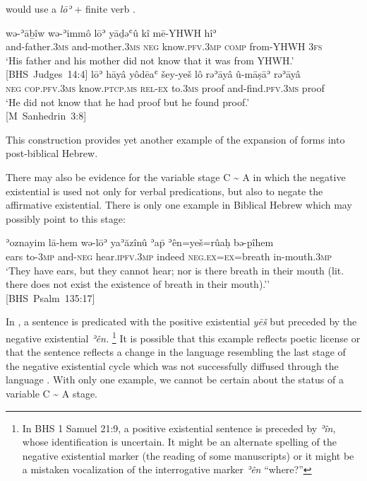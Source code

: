 ﻿\documentclass[output=paper]{langsci/langscibook}
\begin{document}
would use a \textit{lōʾ} + finite verb .
%
\begin{exe}\ex\begin{xlist}
\ex\label{ex:heb-father-and-mother}
\gll wə-ʾāḇîw wə-ʾimmô lōʾ yāḏəʿû kî mē-YHWH hîʾ \\ 
and-father.\textsc{3ms}  and-mother.\textsc{3ms} \textsc{neg}
know.\textsc{pfv.3mp}  \textsc{comp}   from-YHWH \textsc{3fs} \\
\glt `His father and his mother did not know that it was from YHWH.'\\
\mbox{[BHS Judges 14:4]}
%
\ex\label{ex:heb-found-proof}
 \gll lōʾ hāyâ yôdēaʿ šey-yeš lô rəʾāyâ û-māṣāʾ rəʾāyâ \\
\textsc{neg} \textsc{cop.pfv.3ms} know.\textsc{ptcp.ms} \textsc{rel-ex}
to.\textsc{3ms}   proof and-find.\textsc{pfv.3ms}   proof   \\
\glt `He did not know that he had proof but he found proof.'\\
\mbox{[M Sanhedrin 3:8]}
\end{xlist}\end{exe}
%
This construction provides yet another example of the expansion of forms into post-biblical Hebrew.

There may also be evidence for the variable stage C {\textasciitilde} A in which the negative existential is used not only for verbal predications, but also to negate the affirmative existential. There is only one example in Biblical Hebrew which may possibly point to this stage:
%
\begin{exe}\ex \label{ex:heb-ears}
    \gll ʾoznayim lā-hem wə-lōʾ yaʾăzînû ʾa\={p} ʾên=yeš=rûaḥ bə-p̱îhem \\
ears    to-\textsc{3mp}  and-\textsc{neg}  hear.\textsc{ipfv.3mp}   indeed 
  \textsc{neg.ex=ex}=breath  in-mouth.\textsc{3mp} \\
    \glt
`They have ears, but they cannot hear; nor is there breath in their mouth
(lit. there does not exist the existence of breath in their mouth).''\\
\mbox{[BHS Psalm 135:17]}
    \end{exe}
%
In , a sentence is predicated with the positive
existential \textit{yēš} but preceded by the negative existential
\textit{ʾên.}%
%
    \footnote{In BHS 1 Samuel 21:9, a positive existential
    sentence is preceded by \textit{ʾîn}, whose identification is uncertain. It
    might be an alternate spelling of the negative existential marker (the
    reading of some manuscripts) or it might be a mistaken vocalization of the
    interrogative marker \textit{ʾên} ``where?''} %
%
It is possible that this
example reflects poetic license or that the sentence reflects a change in
the language resembling the last stage of the negative existential cycle
which was not successfully diffused through the language \parencite[see][]%
{Naude2012}. With only one example, we cannot be certain about the
status of  a variable C {\textasciitilde} A stage.
\end{document}
